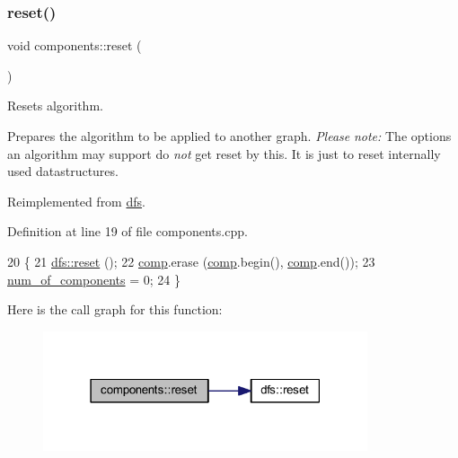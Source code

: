 \subsubsection{\texorpdfstring{reset()}{reset()}}
{\footnotesize\ttfamily void components\+::reset (\begin{DoxyParamCaption}{ }\end{DoxyParamCaption})\hspace{0.3cm}{\ttfamily [virtual]}}



Resets algorithm. 

Prepares the algorithm to be applied to another graph. {\itshape Please} {\itshape note\+:} The options an algorithm may support do {\itshape not} get reset by this. It is just to reset internally used datastructures. 

Reimplemented from \mbox{\hyperlink{classdfs_affaffda8be8418d6dbf396c5b1d6b81a}{dfs}}.



Definition at line 19 of file components.\+cpp.


\begin{DoxyCode}
20 \{ 
21     \mbox{\hyperlink{classdfs_affaffda8be8418d6dbf396c5b1d6b81a}{dfs::reset}} ();
22     \mbox{\hyperlink{classcomponents_a99483a9e5f031e6e6e2e5b0c47c2979e}{comp}}.erase (\mbox{\hyperlink{classcomponents_a99483a9e5f031e6e6e2e5b0c47c2979e}{comp}}.begin(), \mbox{\hyperlink{classcomponents_a99483a9e5f031e6e6e2e5b0c47c2979e}{comp}}.end());
23     \mbox{\hyperlink{classcomponents_ad5a54d7313e23f8c6a2c6347e6ee70a0}{num\_of\_components}} = 0;
24 \}
\end{DoxyCode}
Here is the call graph for this function\+:\nopagebreak
\begin{figure}[H]
\begin{center}
\leavevmode
\includegraphics[width=271pt]{classcomponents_a07b6bab5962524ae26ccb478b35cd76c_cgraph}
\end{center}
\end{figure}
\mbox{\label{classdfs_af56fa2b736f0b924dba1257e18ba4b61}} 
